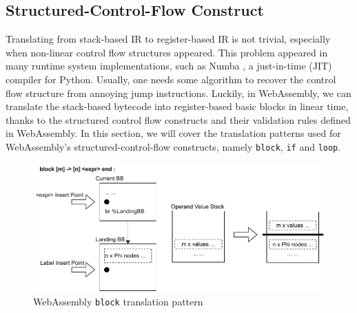 \subsection{Structured-Control-Flow Construct}

Translating from stack-based IR to register-based IR is not trivial, especially
when non-linear control flow structures appeared. This problem appeared in many
runtime system implementations, such as Numba \cite{numba}, a just-in-time (JIT)
compiler for Python. Usually, one needs some algorithm to recover the control
flow structure from annoying jump instructions. Luckily, in WebAssembly, we can
translate the stack-based bytecode into register-based basic blocks in linear
time, thanks to the structured control flow constructs and their validation
rules defined in WebAssembly. In this section, we will cover the translation
patterns used for WebAssembly's structured-control-flow constructs, namely
\texttt{block}, \texttt{if} and \texttt{loop}.

\begin{figure}
  \centering
  \includegraphics[width=\textwidth]{Images/4.MIR/translate-block.pdf}
  \caption{WebAssembly \texttt{block} translation pattern}
  \label{fig:translate-block}
\end{figure}

